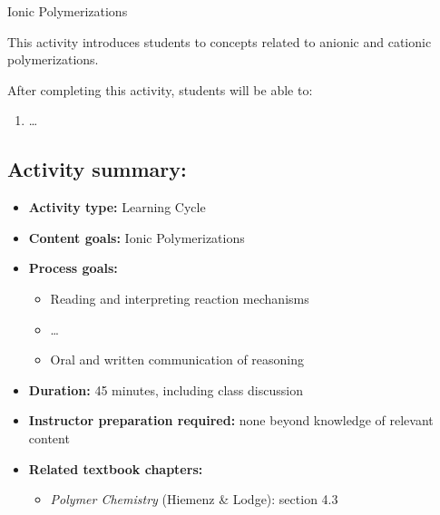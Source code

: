 %
%
%
%

\renewcommand{\figpath}{content/polymchem/livingpolyms/ionic-polyms/figs}
\renewcommand{\labelbase}{ionic-polyms}

\begin{activity}{Ionic Polymerizations}

\begin{instructornotes}
	This activity introduces students to concepts related to anionic and cationic polymerizations.
	
	After completing this activity, students will be able to:
	\begin{enumerate}
		\item \dots
	\end{enumerate}
	
	\subsection*{Activity summary:}
	\begin{itemize}
		\item \textbf{Activity type:} Learning Cycle
		\item \textbf{Content goals:} Ionic Polymerizations
		\item \textbf{Process goals:} %
			\begin{itemize}
				\item Reading and interpreting reaction mechanisms
				\item \dots
				\item Oral and written communication of reasoning
			\end{itemize}
		\item \textbf{Duration:} 45 minutes, including class discussion
		\item \textbf{Instructor preparation required:} none beyond knowledge of relevant content
		\item \textbf{Related textbook chapters:}
			\begin{itemize}
				\item \emph{Polymer Chemistry} (Hiemenz \& Lodge): section 4.3
			\end{itemize}
	\end{itemize}
	

\end{instructornotes}
\end{activity}
